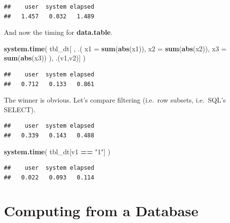 \documentclass[]{book}
\newenvironment{Shaded}{\begin{snugshade}}{\end{snugshade}}
\newcommand{\KeywordTok}[1]{\textcolor[rgb]{0.13,0.29,0.53}{\textbf{#1}}}
\newcommand{\DataTypeTok}[1]{\textcolor[rgb]{0.13,0.29,0.53}{#1}}
\newcommand{\StringTok}[1]{\textcolor[rgb]{0.31,0.60,0.02}{#1}}
\newcommand{\OperatorTok}[1]{\textcolor[rgb]{0.81,0.36,0.00}{\textbf{#1}}}
\newcommand{\NormalTok}[1]{#1}
\theoremstyle{definition}
\theoremstyle{definition}
\theoremstyle{definition}
\theoremstyle{remark}
\begin{document}
\begin{verbatim}
##    user  system elapsed 
##   1.457   0.032   1.489
\end{verbatim}

And now the timing for \textbf{data.table}.

\begin{Shaded}
\begin{Highlighting}[]
\KeywordTok{system.time}\NormalTok{( }
\NormalTok{  tbl_dt[ ,  .( }\DataTypeTok{x1 =} \KeywordTok{sum}\NormalTok{(}\KeywordTok{abs}\NormalTok{(x1)), }\DataTypeTok{x2 =} \KeywordTok{sum}\NormalTok{(}\KeywordTok{abs}\NormalTok{(x2)), }\DataTypeTok{x3 =} \KeywordTok{sum}\NormalTok{(}\KeywordTok{abs}\NormalTok{(x3)) ), .(v1,v2)]}
\NormalTok{  )}
\end{Highlighting}
\end{Shaded}

\begin{verbatim}
##    user  system elapsed 
##   0.712   0.133   0.861
\end{verbatim}

The winner is obvious. Let's compare filtering (i.e.~row subsets,
i.e.~SQL's SELECT).

\begin{Shaded}
\end{Shaded}

\begin{verbatim}
##    user  system elapsed 
##   0.339   0.143   0.488
\end{verbatim}

\begin{Shaded}
\begin{Highlighting}[]
\KeywordTok{system.time}\NormalTok{( }
\NormalTok{  tbl_dt[v1 }\OperatorTok{==}\StringTok{ "1"}\NormalTok{] }
\NormalTok{  )}
\end{Highlighting}
\end{Shaded}

\begin{verbatim}
##    user  system elapsed 
##   0.022   0.093   0.114
\end{verbatim}

\section{Computing from a Database}\label{computing-from-a-database}
\end{document}
